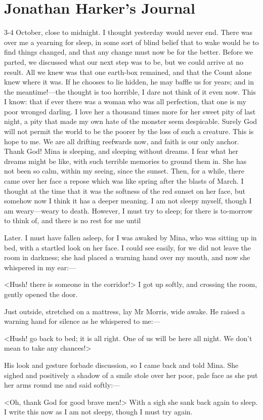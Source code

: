 \section{Jonathan Harker's Journal}

\begin{diary}{3-4 October, close to midnight.}
I thought yesterday would never end. There was over me a yearning for sleep, in some sort of blind belief that to wake would be to find things changed, and that any change must now be for the better. Before we parted, we discussed what our next step was to be, but we could arrive at no result. All we knew was that one earth-box remained, and that the Count alone knew where it was. If he chooses to lie hidden, he may baffle us for years; and in the meantime!—the thought is too horrible, I dare not think of it even now. This I know: that if ever there was a woman who was all perfection, that one is my poor wronged darling. I love her a thousand times more for her sweet pity of last night, a pity that made my own hate of the monster seem despicable. Surely God will not permit the world to be the poorer by the loss of such a creature. This is hope to me. We are all drifting reefwards now, and faith is our only anchor. Thank God! Mina is sleeping, and sleeping without dreams. I fear what her dreams might be like, with such terrible memories to ground them in. She has not been so calm, within my seeing, since the sunset. Then, for a while, there came over her face a repose which was like spring after the blasts of March. I thought at the time that it was the softness of the red sunset on her face, but somehow now I think it has a deeper meaning. I am not sleepy myself, though I am weary—weary to death. However, I must try to sleep; for there is to-morrow to think of, and there is no rest for me until
\end{diary}
 

\begin{diary}{Later.}
I must have fallen asleep, for I was awaked by Mina, who was sitting up in bed, with a startled look on her face. I could see easily, for we did not leave the room in darkness; she had placed a warning hand over my mouth, and now she whispered in my ear:—

<Hush! there is someone in the corridor!> I got up softly, and crossing the room, gently opened the door.

Just outside, stretched on a mattress, lay Mr Morris, wide awake. He raised a warning hand for silence as he whispered to me:—

<Hush! go back to bed; it is all right. One of us will be here all night. We don't mean to take any chances!>

His look and gesture forbade discussion, so I came back and told Mina. She sighed and positively a shadow of a smile stole over her poor, pale face as she put her arms round me and said softly:—

<Oh, thank God for good brave men!> With a sigh she sank back again to sleep. I write this now as I am not sleepy, though I must try again.
\end{diary}
 

